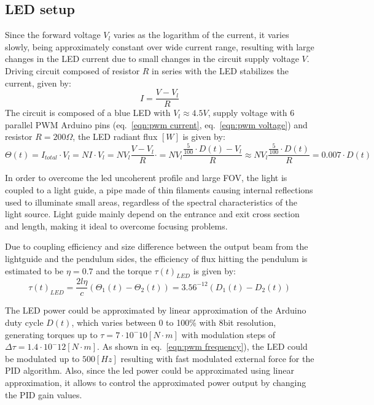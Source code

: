 \documentclass[\main/master.tex]{subfiles}
\begin{document}
\subsection{LED setup}
Since the forward voltage $V_l$ varies as the logarithm of the current, it varies slowly, being approximately constant over wide current range, resulting with large changes in the LED current due to small changes in the circuit supply voltage $V$. Driving circuit composed of resistor $R$ in series with the LED stabilizes the current, given by:
\begin{equation}
I =\frac{V-V_l}{R} \label{eqn:led circuit}
\end{equation}
The circuit is composed of a blue LED with $V_l\approx 4.5V$, supply voltage with 6 parallel PWM Arduino pins (eq.~\ref{eqn:pwm current}, eq.~\ref{eqn:pwm voltage}) and resistor $R = 200\Omega$, the LED radiant flux $[W]$ is given by:
\begin{equation}
\Theta(t) = I_{total}\cdot V_l = NI\cdot V_l = N V_l \frac{V-V_l}{R}\cdot  =N V_l\frac{\frac{5}{100}\cdot D(t)-V_l}{R} \approx N V_l\frac{\frac{5}{100}\cdot D(t)}{R} = 0.007\cdot D(t)\label{eqn:led power}
\end{equation}
\par\noindent
In order to overcome the led uncoherent profile and large FOV, the light is coupled to a light guide, a pipe made of thin filaments causing internal reflections used  to illuminate small areas, regardless of the spectral characteristics of the light source. Light guide mainly depend on the entrance and exit cross section and length, making it ideal to overcome focusing problems. 
\par\noindent
Due to coupling efficiency and size difference between the output beam from the lightguide and the pendulum sides, the efficiency of flux hitting the pendulum is estimated to be $\eta = 0.7$ and the torque $\tau(t)_{LED}$ is given by:
\begin{equation}
\tau(t)_{LED}  =\frac{2l\eta}{{c}} (\Theta_1(t) -\Theta_2(t)) = 3.56^{-12}(D_1(t) -D_2(t)) 
\label{eqn:led torque}
\end{equation}
\par\noindent
The LED power could be approximated by linear approximation of the Arduino duty cycle $D(t)$, which varies between 0 to 100\% with 8bit resolution, generating torques up to $\tau = 7\cdot10^-{10} [N\cdot m]$ with modulation steps of $\Delta\tau = 1.4\cdot10^-{12} [N\cdot m]$. As shown in eq.~\ref{eqn:pwm frequency}), the LED could be modulated up to $500[Hz]$ resulting with fast modulated external force for the PID algorithm. Also, since the led power could be approximated using linear approximation, it allows to control the approximated power output by changing the PID gain values.  
\end{document}

